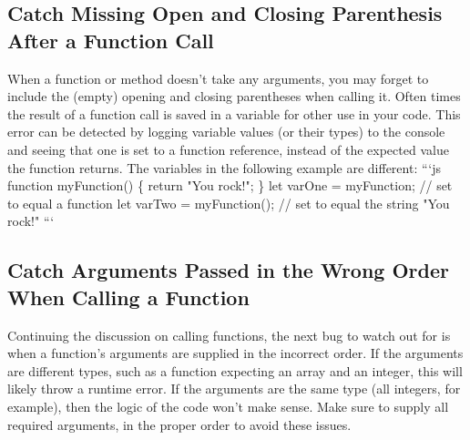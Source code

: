 \documentclass{article}%
\begin{document}
\subsection{Catch Missing Open and Closing Parenthesis After a Function Call}%
\label{subsec:CatchMissingOpenandClosingParenthesisAfteraFunctionCall}%
When a function or method doesn't take any arguments, you may forget to include the (empty) opening and closing parentheses when calling it. Often times the result of a function call is saved in a variable for other use in your code. This error can be detected by logging variable values (or their types) to the console and seeing that one is set to a function reference, instead of the expected value the function returns.\newline%
The variables in the following example are different:\newline%
```js\newline%
function myFunction() \{\newline%
  return "You rock!";\newline%
\}\newline%
let varOne = myFunction; // set to equal a function\newline%
let varTwo = myFunction(); // set to equal the string "You rock!"\newline%
```\newline%

%
\subsection{Catch Arguments Passed in the Wrong Order When Calling a Function}%
\label{subsec:CatchArgumentsPassedintheWrongOrderWhenCallingaFunction}%
Continuing the discussion on calling functions, the next bug to watch out for is when a function's arguments are supplied in the incorrect order. If the arguments are different types, such as a function expecting an array and an integer, this will likely throw a runtime error. If the arguments are the same type (all integers, for example), then the logic of the code won't make sense. Make sure to supply all required arguments, in the proper order to avoid these issues.\newline%

%
\end{document}
